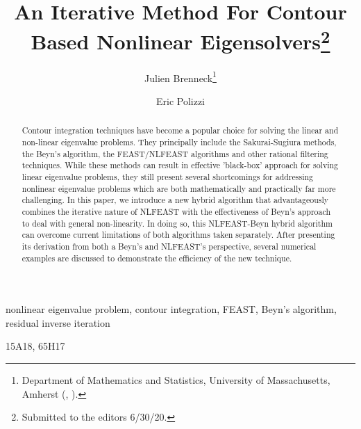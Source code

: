 \documentclass[onefignum,onetabnum]{siamart190516}
\title{An Iterative Method For Contour Based Nonlinear Eigensolvers\thanks{Submitted to the editors 6/30/20.
\funding{National Science Foundation grants SI2-SSE-1739423 and AF-1813480.}
}}
\author{Julien Brenneck\thanks{Department of Mathematics and Statistics, University of Massachusetts, Amherst
	(\email{jbrenneck@math.umass.edu}, \email{polizzi@ecs.umass.edu}).}
  \and Eric Polizzi\footnotemark[2]
}
\begin{document}
\maketitle

\begin{abstract}
Contour integration techniques have become a popular choice for solving the linear and non-linear eigenvalue problems.
  They principally include the Sakurai-Sugiura methods, the Beyn's algorithm, the FEAST/NLFEAST algorithms and  other rational filtering techniques.
  While these methods can result in effective 'black-box' approach for solving linear eigenvalue problems,
  they still present several shortcomings for addressing nonlinear eigenvalue problems which are both mathematically and practically far more challenging.
  In this paper, we introduce a new hybrid algorithm that advantageously combines the iterative nature of NLFEAST with the effectiveness of Beyn's approach to deal with general non-linearity.
  In doing so, this NLFEAST-Beyn hybrid algorithm can overcome current limitations of both algorithms taken separately.
  After presenting its derivation from both a Beyn's and NLFEAST's perspective, several numerical examples are discussed
  to demonstrate the efficiency of the new technique.
\end{abstract}

\begin{keywords}
  nonlinear eigenvalue problem, contour integration, FEAST, Beyn's algorithm, residual inverse iteration
\end{keywords}

\begin{AMS}
  15A18, 65H17
\end{AMS}
\end{document}

